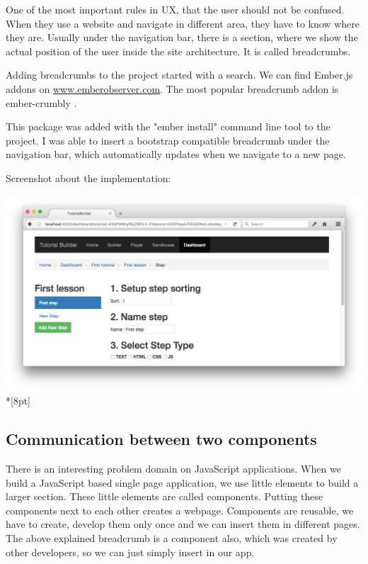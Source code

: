 \documentclass[12pt, a4paper, oneside, openright, medskipamount]{report}
\begin{document}
One of the most important rules in UX, that the user should not be confused. When they use a website and navigate in different area, they have to know where they are. Usually under the navigation bar, there is a section, where we show the actual position of the user inside the site architecture. It is called breadcrumbs.

Adding breadcrumbs to the project started with a search. We can find Ember.js addons on \url{www.emberobserver.com}. The most popular breadcrumb addon is ember-crumbly \cite{ember-crumbly}.

This package was added with the "ember install" command line tool to the project. I was able to insert a bootstrap compatible breadcrumb under the navigation bar, which automatically updates when we navigate to a new page.

Screenshot about the implementation:

\includegraphics[width=1\textwidth]{assets/breadcrumb-screenshot.png}\\*[8pt]

\subsection{Communication between two components}

There is an interesting problem domain on JavaScript applications. When we build a JavaScript based single page application, we use little elements to build a larger section. These little elements are called components. Putting these components next to each other creates a webpage. Components are reusable, we have to create, develop them only once and we can insert them in different pages. The above explained breadcrumb is a component also, which was created by other developers, so we can just simply insert in our app.
\end{document}
